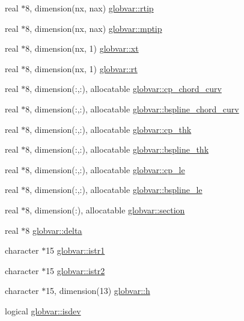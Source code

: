 \begin{DoxyCompactItemize}
real $\ast$8, dimension(nx, nax) \hyperlink{namespaceglobvar_a4e1a21e3c393a1e8a669dfc2ba04d5d7}{globvar\+::rtip}
\item 
real $\ast$8, dimension(nx, nax) \hyperlink{namespaceglobvar_a31a35cf7209d884eb1891745486853f5}{globvar\+::mptip}
\item 
real $\ast$8, dimension(nx, 1) \hyperlink{namespaceglobvar_aee98d6758bfc663151ebb025dc270fa3}{globvar\+::xt}
\item 
real $\ast$8, dimension(nx, 1) \hyperlink{namespaceglobvar_a1f58904a75cc5add66afa721914c4eb7}{globvar\+::rt}
\item 
real $\ast$8, dimension(\+:,\+:), allocatable \hyperlink{namespaceglobvar_a96dfca1007470c8ba8a1d5a54678775f}{globvar\+::cp\+\_\+chord\+\_\+curv}
\item 
real $\ast$8, dimension(\+:,\+:), allocatable \hyperlink{namespaceglobvar_ac2712a968280dc32e12e905f6cc3cc91}{globvar\+::bspline\+\_\+chord\+\_\+curv}
\item 
real $\ast$8, dimension(\+:,\+:), allocatable \hyperlink{namespaceglobvar_a3959c8a967075c593a747c5c54b50a53}{globvar\+::cp\+\_\+thk}
\item 
real $\ast$8, dimension(\+:,\+:), allocatable \hyperlink{namespaceglobvar_af72c9cb4baffb66f0f81b68cef5018e8}{globvar\+::bspline\+\_\+thk}
\item 
real $\ast$8, dimension(\+:,\+:), allocatable \hyperlink{namespaceglobvar_aedf6762d5f8bc876b3c01afd7e8e6b41}{globvar\+::cp\+\_\+le}
\item 
real $\ast$8, dimension(\+:,\+:), allocatable \hyperlink{namespaceglobvar_a5c6f14b2066b824a38b5a56803ec5c3a}{globvar\+::bspline\+\_\+le}
\item 
real $\ast$8, dimension(\+:), allocatable \hyperlink{namespaceglobvar_a7ae731b4717928e79d30248e180567de}{globvar\+::section}
\item 
real $\ast$8 \hyperlink{namespaceglobvar_a9378a0ca5bc1638562a71eb8e31b439d}{globvar\+::delta}
\item 
character $\ast$15 \hyperlink{namespaceglobvar_a8188fa7b4bc004641487eec2f8a46276}{globvar\+::istr1}
\item 
character $\ast$15 \hyperlink{namespaceglobvar_a96979fe04e2455f86ca3dbb38cc4aac1}{globvar\+::istr2}
\item 
character $\ast$15, dimension(13) \hyperlink{namespaceglobvar_a05ffe1b752c11acb73ba6f8a4a854e94}{globvar\+::h}
\item 
logical \hyperlink{namespaceglobvar_a06009d87ddfdfce921d7c631e307aa1e}{globvar\+::isdev}

\end{DoxyCompactItemize}

